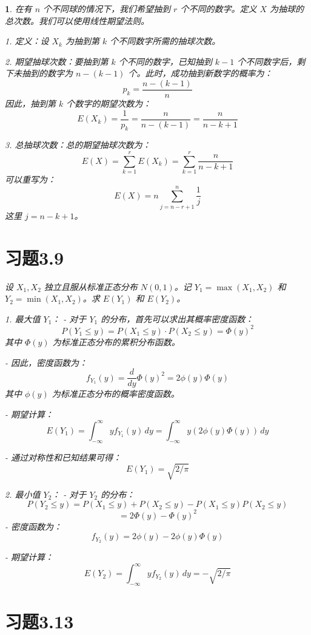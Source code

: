 \documentclass[UTF8]{report}
\theoremstyle{MyLineTheoremStyle} %
\theoremstyle{MyBlockTheoremStyle} %
\theoremstyle{MySubsubsectionStyle} %
\newtheorem{definition}{}
\begin{document}
\begin{definition}
在有 \( n \) 个不同球的情况下，我们希望抽到 \( r \) 个不同的数字。定义 \( X \) 为抽球的总次数。我们可以使用线性期望法则。

1. 定义：设 \( X_k \) 为抽到第 \( k \) 个不同数字所需的抽球次数。

2. 期望抽球次数：要抽到第 \( k \) 个不同的数字，已知抽到 \( k-1 \) 个不同数字后，剩下未抽到的数字为 \( n - (k - 1) \) 个。此时，成功抽到新数字的概率为：
   \[
   p_k = \frac{n - (k - 1)}{n}
   \]
   因此，抽到第 \( k \) 个数字的期望次数为：
   \[
   E(X_k) = \frac{1}{p_k} = \frac{n}{n - (k - 1)} = \frac{n}{n - k + 1}
   \]

3. 总抽球次数：总的期望抽球次数为：
   \[
   E(X) = \sum_{k=1}^{r} E(X_k) = \sum_{k=1}^{r} \frac{n}{n - k + 1}
   \]
   可以重写为：
   \[
   E(X) = n \sum_{j=n-r+1}^{n} \frac{1}{j}
   \]
   这里 \( j = n - k + 1 \)。

\section{习题3.9}

设 \( X_1, X_2 \) 独立且服从标准正态分布 \( N(0, 1) \)。记 \( Y_1 = \max(X_1, X_2) \) 和 \( Y_2 = \min(X_1, X_2) \)。求 \( E(Y_1) \) 和 \( E(Y_2) \)。

1. 最大值 \( Y_1 \)：
   - 对于 \( Y_1 \) 的分布，首先可以求出其概率密度函数：
   \[
   P(Y_1 \leq y) = P(X_1 \leq y) \cdot P(X_2 \leq y) = \Phi(y)^2
   \]
   其中 \( \Phi(y) \) 为标准正态分布的累积分布函数。

   - 因此，密度函数为：
   \[
   f_{Y_1}(y) = \frac{d}{dy} \Phi(y)^2 = 2\phi(y) \Phi(y)
   \]
   其中 \( \phi(y) \) 为标准正态分布的概率密度函数。

   - 期望计算：
   \[
   E(Y_1) = \int_{-\infty}^{\infty} y f_{Y_1}(y) \, dy = \int_{-\infty}^{\infty} y (2\phi(y) \Phi(y)) \, dy
   \]

   - 通过对称性和已知结果可得：
   \[
   E(Y_1) = \sqrt{2/\pi}
   \]

2. 最小值 \( Y_2 \)：
   - 对于 \( Y_2 \) 的分布：
   \[
   P(Y_2 \leq y) = P(X_1 \leq y) + P(X_2 \leq y) - P(X_1 \leq y)P(X_2 \leq y)
   \]
   \[
   = 2\Phi(y) - \Phi(y)^2
   \]
   - 密度函数为：
   \[
   f_{Y_2}(y) = 2\phi(y) - 2\phi(y)\Phi(y)
   \]

   - 期望计算：
   \[
   E(Y_2) = \int_{-\infty}^{\infty} y f_{Y_2}(y) \, dy = -\sqrt{2/\pi}
   \]

\section{习题3.13}


\end{definition}
\end{document}
